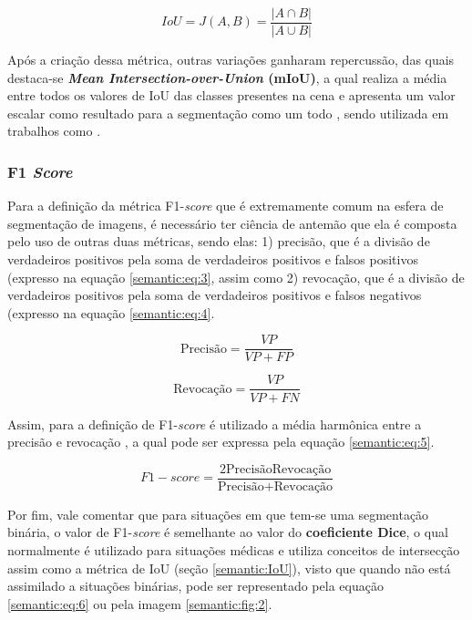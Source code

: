 \begin{equation}
    \label{semantic:eq:2}
    IoU = J(A,B) = \frac{|A \cap B|}{|A \cup B|}
\end{equation}

Após a criação dessa métrica, outras variações ganharam repercussão, das quais destaca-se \textbf{\textit{Mean Intersection-over-Union} (mIoU)}, a qual realiza a média entre todos os valores de IoU das classes presentes na cena e apresenta um valor escalar como resultado para a segmentação como um todo \cite{Minaee2021}, sendo utilizada em trabalhos como \cite{Mohan2020}.


\subsubsection{F1 \textit{Score}}
\label{semantic:f1}

Para a definição da métrica F1-\textit{score} que é extremamente comum na esfera de segmentação de imagens, é necessário ter ciência de antemão que ela é composta pelo uso de outras duas métricas, sendo elas: 1) precisão, que é a divisão de verdadeiros positivos pela soma de verdadeiros positivos e falsos positivos (expresso na equação \ref{semantic:eq:3}, assim como 2) revocação, que é a divisão de verdadeiros positivos pela soma de verdadeiros positivos e falsos negativos (expresso na equação \ref{semantic:eq:4}.

\begin{equation}
    \label{semantic:eq:3}
    \text{Precisão} = \frac{VP}{VP + FP}
\end{equation}

\begin{equation}
    \label{semantic:eq:4}
    \text{Revocação} = \frac{VP}{VP + FN}
\end{equation}

Assim, para a definição de F1-\textit{score} é utilizado a média harmônica entre a precisão e revocação \cite{Minaee2021}, a qual pode ser expressa pela equação \ref{semantic:eq:5}.

\begin{equation}
    \label{semantic:eq:5}
    F1-score = \frac{2 \text{Precisão} \text{Revocação}}{\text{Precisão} + \text{Revocação}}
\end{equation}

Por fim, vale comentar que para situações em que tem-se uma segmentação binária, o valor de F1-\textit{score} é semelhante ao valor do \textbf{coeficiente Dice}, o qual normalmente é utilizado para situações médicas \cite{Minaee2021} e utiliza conceitos de intersecção assim como a métrica de IoU (seção \ref{semantic:IoU}), visto que quando não está assimilado a situações binárias, pode ser representado pela equação \ref{semantic:eq:6} ou pela imagem \ref{semantic:fig:2}.

